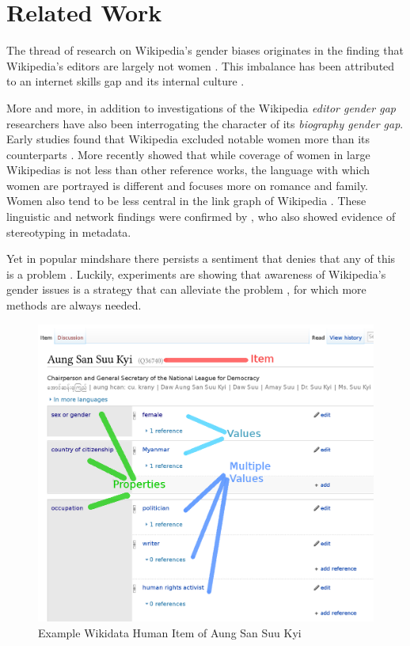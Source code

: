 \documentclass{sig-alternate-05-2015}
\begin{document}
\section{Related Work}

The thread of research on Wikipedia's gender biases originates in the finding that Wikipedia's editors are largely not women \cite{hill_wikipedia_2013}. This imbalance has been attributed to an internet skills gap \cite{hargittai_mind_2015} and its internal culture \cite{lam_wp:clubhouse?:_2011}. 

More and more, in addition to investigations of the Wikipedia \textit{editor gender gap} researchers have also been interrogating the character of its \textit{biography gender gap}. Early studies found that Wikipedia excluded notable women more than its counterparts \cite{reagle_gender_2011}. More recently \cite{wagner_its_2015} showed that while coverage of women in large Wiki\-pedias is not less than other reference works, the language with which women are portrayed is different and focuses more on romance and family. Women also tend to be less central in the link graph of Wikipedia \cite{10.1371/journal.pone.0114825}. These linguistic and network findings were confirmed by \cite{graells-garrido_first_2015}, who also showed evidence of stereotyping in metadata.

Yet in popular mindshare there persists a sentiment that denies that any of this is a problem \cite{eckert_retriggering_2013}. Luckily, experiments are showing that awareness of Wikipedia's gender issues is a strategy that can alleviate the problem \cite{hinnosaar_gender_2015}, for which more methods are always needed.

\begin{figure}
\includegraphics[width=\columnwidth]{figures/aung_explainer_small.png} 
\caption{Example Wikidata Human Item of Aung San Suu Kyi}
\label{fig:aung}
\end{figure}
\end{document}
